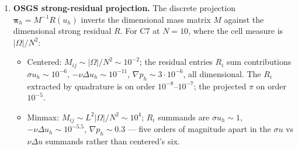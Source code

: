 \documentclass[11pt]{article}
\begin{document}
\begin{enumerate}
\item \textbf{OSGS strong-residual projection.} The discrete projection
      $\boldsymbol{\pi}_h = M^{-1} R(u_h)$ inverts the dimensional mass
      matrix $M$ against the dimensional strong residual $R$. For C7 at
      $N=10$, where the cell measure is $|\Omega|/N^2$:

      \begin{itemize}
      \item Centered: $M_{ij} \sim |\Omega|/N^2 \sim 10^{-2}$;
            the residual entries $R_i$ sum contributions
            $\sigma u_h \sim 10^{-6}$, $-\nu \Delta u_h \sim 10^{-11}$,
            $\nabla p_h \sim 3 \cdot 10^{-6}$, all dimensional. The
            $R_i$ extracted by quadrature is on order
            $10^{-8}$--$10^{-7}$; the projected $\pi$ on order $10^{-5}$.
      \item Minmax: $M_{ij} \sim L^2 |\Omega|/N^2 \sim 10^{4}$;
            $R_i$ summands are $\sigma u_h \sim 1$,
            $-\nu \Delta u_h \sim 10^{-5.5}$,
            $\nabla p_h \sim 0.3$ — five orders of magnitude apart in
            the $\sigma u$ vs $\nu \Delta u$ summands rather than
            centered's six.
      \end{itemize}


\end{enumerate}
\end{document}
